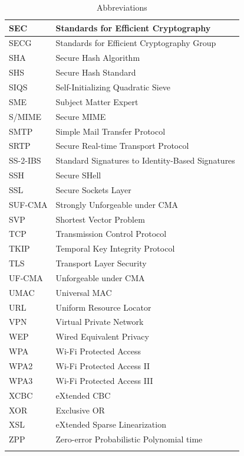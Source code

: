 \documentclass[a4paper, 12pt]{book} %
\begin{document}
\begin{longtable}{||lp{11cm}||}
    SEC & Standards for Efficient Cryptography \\ \hline 
    SECG & Standards for Efficient Cryptography Group \\ \hline 
    SHA & Secure Hash Algorithm \\ \hline 
    SHS & Secure Hash Standard \\ \hline 
    SIQS & Self-Initializing Quadratic Sieve \\ \hline 
    SME & Subject Matter Expert \\ \hline 
    S/MIME & Secure MIME \\ \hline 
    SMTP & Simple Mail Transfer Protocol \\ \hline 
    SRTP & Secure Real-time Transport Protocol \\ \hline 
    SS-2-IBS & Standard Signatures to Identity-Based Signatures \\ \hline 
    SSH & Secure SHell \\ \hline 
    SSL & Secure Sockets Layer \\ \hline 
    SUF-CMA & Strongly Unforgeable under CMA \\ \hline 
    SVP & Shortest Vector Problem \\ \hline 
    TCP & Transmission Control Protocol \\ \hline 
    TKIP & Temporal Key Integrity Protocol \\ \hline 
    TLS & Transport Layer Security \\ \hline 
    UF-CMA & Unforgeable under CMA \\ \hline 
    UMAC & Universal MAC \\ \hline 
    URL & Uniform Resource Locator \\ \hline 
    VPN & Virtual Private Network \\ \hline 
    WEP & Wired Equivalent Privacy \\ \hline 
    WPA & Wi-Fi Protected Access \\ \hline 
    WPA2 & Wi-Fi Protected Access II \\ \hline 
    WPA3 & Wi-Fi Protected Access III \\ \hline 
    XCBC & eXtended CBC \\ \hline 
    XOR & Exclusive OR \\ \hline 
    XSL & eXtended Sparse Linearization \\ \hline 
    ZPP & Zero-error Probabilistic Polynomial time \\ \hline 
    \caption{Abbreviations}
\end{longtable}
\end{document}
